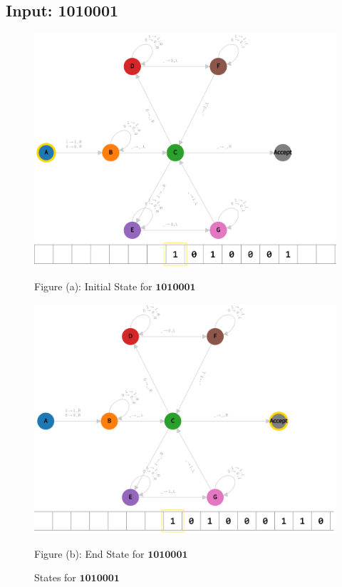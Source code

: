 \vspace*{\fill}
\newpage
\vspace*{\fill}

\subsection*{Input: 1010001}

\begin{figure}[ht]
  \centering
  \begin{minipage}{.49\linewidth}
    \centering
    \includegraphics[width=\linewidth]{answers/img/q2-1010001-initial.png}
    \caption*{Figure (a): Initial State for $\mathbf{1010001}$}
    \label{fig:1010001-initial}
  \end{minipage}
  \begin{minipage}{.49\linewidth}
    \centering
    \includegraphics[width=\linewidth]{answers/img/q2-1010001-end.png}
    \caption*{Figure (b): End State for $\mathbf{1010001}$}
    \label{fig:1010001-end}
  \end{minipage}
  \caption{States for $\mathbf{1010001}$}
  \label{fig:in-1010001}
\end{figure}


